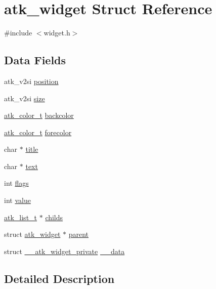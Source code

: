 \hypertarget{structatk__widget}{\section{atk\+\_\+widget Struct Reference}
\label{structatk__widget}
}


{\ttfamily \#include $<$widget.\+h$>$}

\subsection*{Data Fields}
\begin{DoxyCompactItemize}
\item 
atk\+\_\+v2si \hyperlink{structatk__widget_a24145b1d5428ec2211dabe700dfe2076}{position}
\item 
atk\+\_\+v2si \hyperlink{structatk__widget_a03bb553a3c4b8b7523a56bcebd489fbc}{size}
\item 
\hyperlink{atk_8h_a85e5d8dafaa1bf57b05a1cd0dd9d3b82}{atk\+\_\+color\+\_\+t} \hyperlink{structatk__widget_a1ce3f914210cd44c532688e1b98e7ba7}{backcolor}
\item 
\hyperlink{atk_8h_a85e5d8dafaa1bf57b05a1cd0dd9d3b82}{atk\+\_\+color\+\_\+t} \hyperlink{structatk__widget_a303ad035289ebebf801d76720ff37065}{forecolor}
\item 
char $\ast$ \hyperlink{structatk__widget_a1f6e2c4d43fa2723ea96e74e4369f915}{title}
\item 
char $\ast$ \hyperlink{structatk__widget_a1d572a95740071ab836bb88609bb28c4}{text}
\item 
int \hyperlink{structatk__widget_a5b936c20bb006d5a45855873bb96f4f5}{flags}
\item 
int \hyperlink{structatk__widget_a7476e90289581e13fe6978ac3dbc9b0c}{value}
\item 
\hyperlink{atk_8h_a2c8c224ba001105422a0814f71ae5887}{atk\+\_\+list\+\_\+t} $\ast$ \hyperlink{structatk__widget_a7309354f2c4bcf58373c2aebf599a2e1}{childs}
\item 
struct \hyperlink{structatk__widget}{atk\+\_\+widget} $\ast$ \hyperlink{structatk__widget_ae82913e03415708354bc5088890f7b19}{parent}
\item 
struct \hyperlink{struct____atk__widget__private}{\+\_\+\+\_\+atk\+\_\+widget\+\_\+private} \hyperlink{structatk__widget_a2af132bf83c5a165c04ec1dd67e781e5}{\+\_\+\+\_\+data}
\end{DoxyCompactItemize}


\subsection{Detailed Description}


